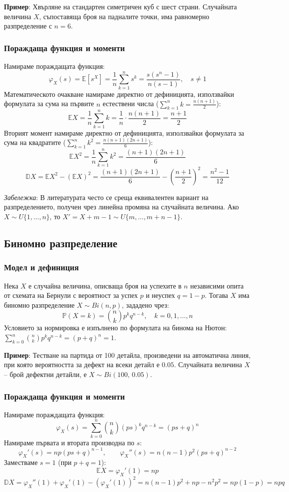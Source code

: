 \documentclass{scrartcl}
\begin{document}
\begin{FlushLeft}
\textbf{Пример}: Хвърляне на стандартен симетричен куб с шест страни. Случайната величина $X$, съпоставяща броя на падналите точки, има равномерно разпределение с $n = 6$.

\subsubsection{Пораждаща функция и моменти}
Намираме пораждащата функция:
\[ \varphi_X(s) = \mathbb{E}[s^X] = \frac{1}{n} \sum_{k=1}^{n} s^k = \frac{s(s^n - 1)}{n(s - 1)}, \quad s \neq 1 \]
Математическото очакване намираме директно от дефиницията, използвайки формулата за сума на първите $n$ естествени числа ($\sum_{k=1}^n k = \frac{n(n+1)}{2}$):
\[ \mathbb{E}X = \frac{1}{n} \sum_{k=1}^{n} k = \frac{1}{n} \cdot \frac{n(n+1)}{2} = \frac{n+1}{2} \]
Вторият момент намираме директно от дефиницията, използвайки формулата за сума на квадратите ($\sum_{k=1}^n k^2 = \frac{n(n+1)(2n+1)}{6}$):
\[ \mathbb{E}X^2 = \frac{1}{n} \sum_{k=1}^{n} k^2 = \frac{(n+1)(2n+1)}{6} \]
\[ \mathbb{D}X = \mathbb{E}X^2 - (\mathbb{E}X)^2 = \frac{(n+1)(2n+1)}{6} - \left(\frac{n+1}{2}\right)^2 = \frac{n^2 - 1}{12} \]

\textit{Забележка}: В литературата често се среща еквивалентен вариант на разпределението, получен чрез линейна промяна на случайната величина. Ако $X \sim U\{1, \dots, n\}$, то $X' = X + m - 1 \sim U\{m, \dots, m+n-1\}$.

\subsection{Биномно разпределение}
\subsubsection{Модел и дефиниция}
Нека $X$ е случайна величина, описваща броя на успехите в $n$ независими опита от схемата на Бернули с вероятност за успех $p$ и неуспех $q = 1 - p$. Тогава $X$ има биномно разпределение $X \sim Bi(n, p)$, зададено чрез:
\[ \mathbb{P}(X = k) = \binom{n}{k} p^k q^{n-k}, \quad k = 0, 1, \dots, n \]
Условието за нормировка е изпълнено по формулата на бинома на Нютон: $\sum_{k=0}^n \binom{n}{k} p^k q^{n-k} = (p+q)^n = 1$.

\textbf{Пример}: Тестване на партида от 100 детайла, произведени на автоматична линия, при която вероятността за дефект на всеки детайл е $0.05$. Случайната величина $X$ – брой дефектни детайли, е $X \sim Bi(100,\, 0.05)$.

\subsubsection{Пораждаща функция и моменти}
Намираме пораждащата функция:
\[ \varphi_X(s) = \sum_{k=0}^{n} \binom{n}{k} (ps)^k q^{n-k} = (ps + q)^n \]
Намираме първата и втората производна по $s$:
\[ \varphi_X'(s) = np(ps + q)^{n-1}, \qquad \varphi_X''(s) = n(n-1)p^2(ps + q)^{n-2} \]
Заместваме $s = 1$ (при $p + q = 1$):
\[ \mathbb{E}X = \varphi_X'(1) = np \]
\[ \mathbb{D}X = \varphi_X''(1) + \varphi_X'(1) - (\varphi_X'(1))^2 = n(n-1)p^2 + np - n^2p^2 = np(1-p) = npq \]


\end{FlushLeft}
\end{document}
